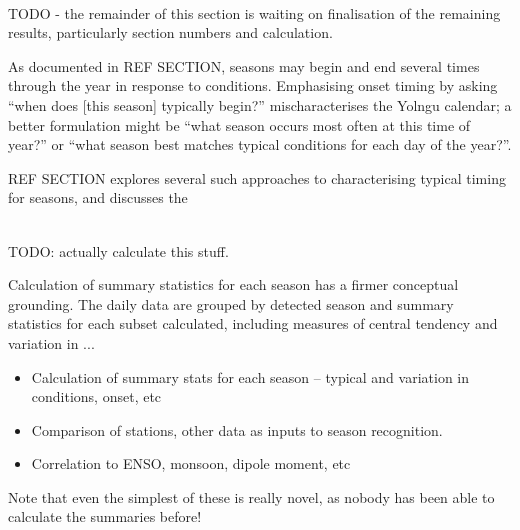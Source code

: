 ~\\

TODO - the remainder of this section is waiting on finalisation of the
remaining results, particularly section numbers and calculation.

As documented in REF SECTION, seasons may begin and end several
times through the year in response to conditions.  Emphasising onset timing
by asking ``when does [this season] typically begin?'' mischaracterises the
Yolngu calendar; a better formulation might be ``what season occurs most
often at this time of year?'' or ``what season best matches typical conditions
for each day of the year?''.

REF SECTION explores several such approaches to characterising typical
timing for seasons, and discusses the 


~\\

TODO: actually calculate this stuff.

Calculation of summary statistics for each season has a firmer conceptual
grounding.  The daily data are grouped by detected season and summary statistics
for each subset calculated, including measures of central tendency and
variation in ... 
\begin{itemize}
\item Calculation of summary stats for each season – typical and variation in conditions, onset, etc
\item Comparison of stations, other data as inputs to season recognition.
\item Correlation to ENSO, monsoon, dipole moment, etc
\end{itemize}

Note that even the simplest of these is really novel, as nobody has
been able to calculate the summaries before!

